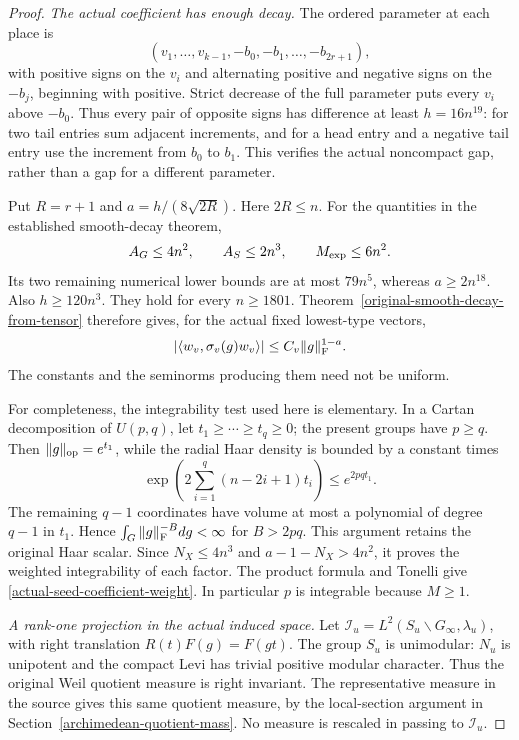 \begin{proof}
\noindent\emph{The actual coefficient has enough decay.}
The ordered parameter at each place is
\[
 (v_1,\ldots,v_{k-1},-b_0,-b_1,\ldots,-b_{2r+1}),
\]
with positive signs on the $v_i$ and alternating positive and
negative signs on the $-b_j$, beginning with positive.  Strict
decrease of the full parameter puts every $v_i$ above $-b_0$.
Thus every pair of opposite signs has difference at least
$h=16n^{19}$: for two tail entries sum adjacent increments, and
for a head entry and a negative tail entry use the increment from
$b_0$ to $b_1$.  This verifies the actual noncompact gap, rather
than a gap for a different parameter.\cite{seed-decay-gap-source}

Put $R=r+1$ and $a=h/(8\sqrt{2R})$.  Here $2R\le n$.
For the quantities in the established smooth-decay theorem,
\[
 A_G\le4n^2,\qquad A_S\le2n^3,\qquad M_{\rm exp}\le6n^2.
\]
Its two remaining numerical lower bounds are at most $79n^5$,
whereas $a\ge2n^{18}$.  Also $h\ge120n^3$.  They hold for
every $n\ge1801$.  Theorem~\ref{original-smooth-decay-from-tensor}
therefore gives, for the actual fixed lowest-type vectors,
\[
 |\langle w_v,\sigma_v(g)w_v\rangle|
                    \le C_v\|g\|_{\rm F}^{1-a}.
\]
The constants and the seminorms producing them need not be uniform.

For completeness, the integrability test used here is elementary.
In a Cartan decomposition of $U(p,q)$, let
$t_1\ge\cdots\ge t_q\ge0$; the present groups have $p\ge q$.
Then $\|g\|_{\rm op}=e^{t_1}$, while the radial Haar density is
bounded by a constant times
\[
 \exp\!\left(2\sum_{i=1}^q(n-2i+1)t_i\right)
                                      \le e^{2pq t_1}.
\]
The remaining $q-1$ coordinates have volume at most a polynomial
of degree $q-1$ in $t_1$.  Hence
$\int_G\|g\|_{\rm F}^{-B}dg<\infty$ for $B>2pq$.
This argument retains the original Haar scalar.  Since
$N_X\le4n^3$ and $a-1-N_X>4n^2$, it proves the weighted
integrability of each factor.  The product formula and Tonelli
give \eqref{actual-seed-coefficient-weight}.  In particular $p$
is integrable because $M\ge1$.

\medskip\noindent\emph{A rank-one projection in the actual induced space.}
Let $\mathcal I_u=L^2(S_u\backslash G_\infty,\lambda_u)$, with
right translation $R(t)F(g)=F(gt)$.  The group $S_u$ is
unimodular: $N_u$ is unipotent and the compact Levi has trivial
positive modular character.  Thus the original Weil quotient
measure is right invariant.  The representative measure in the
source gives this same quotient measure, by the local-section
argument in Section~\ref{archimedean-quotient-mass}.  No measure
is rescaled in passing to $\mathcal I_u$.


\end{proof}
